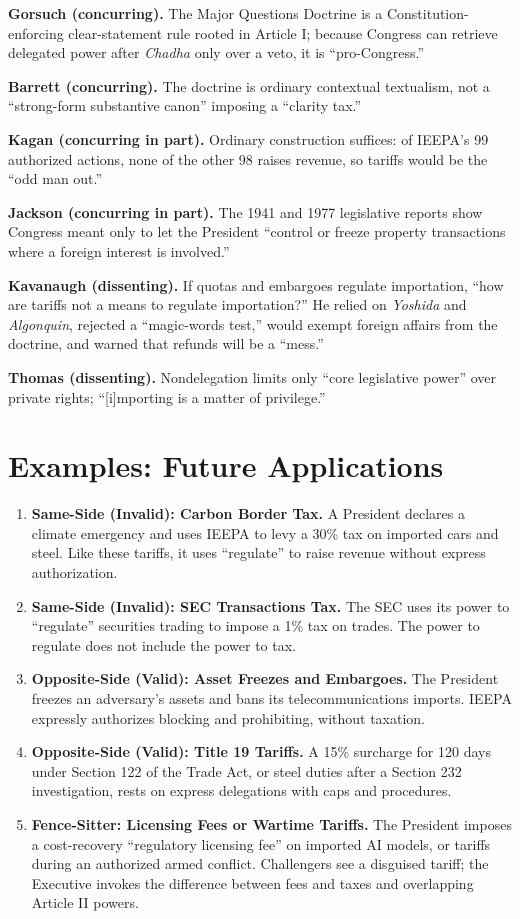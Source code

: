 \documentclass[12pt]{article}
\begin{document}
\textbf{Gorsuch (concurring).} The Major Questions Doctrine is a Constitution-enforcing clear-statement rule rooted in Article I; because Congress can retrieve delegated power after \textit{Chadha} only over a veto, it is ``pro-Congress.''

\textbf{Barrett (concurring).} The doctrine is ordinary contextual textualism, not a ``strong-form substantive canon'' imposing a ``clarity tax.''

\textbf{Kagan (concurring in part).} Ordinary construction suffices: of IEEPA's 99 authorized actions, none of the other 98 raises revenue, so tariffs would be the ``odd man out.''

\textbf{Jackson (concurring in part).} The 1941 and 1977 legislative reports show Congress meant only to let the President ``control or freeze property transactions where a foreign interest is involved.''

\textbf{Kavanaugh (dissenting).} If quotas and embargoes regulate importation, ``how are tariffs not a means to regulate importation?'' He relied on \textit{Yoshida} and \textit{Algonquin}, rejected a ``magic-words test,'' would exempt foreign affairs from the doctrine, and warned that refunds will be a ``mess.''

\textbf{Thomas (dissenting).} Nondelegation limits only ``core legislative power'' over private rights; ``[i]mporting is a matter of privilege.''

\section{Examples: Future Applications}

\begin{enumerate}
\item \textbf{Same-Side (Invalid): Carbon Border Tax.} A President declares a climate emergency and uses IEEPA to levy a 30\% tax on imported cars and steel. Like these tariffs, it uses ``regulate'' to raise revenue without express authorization.
\item \textbf{Same-Side (Invalid): SEC Transactions Tax.} The SEC uses its power to ``regulate'' securities trading to impose a 1\% tax on trades. The power to regulate does not include the power to tax.
\item \textbf{Opposite-Side (Valid): Asset Freezes and Embargoes.} The President freezes an adversary's assets and bans its telecommunications imports. IEEPA expressly authorizes blocking and prohibiting, without taxation.
\item \textbf{Opposite-Side (Valid): Title 19 Tariffs.} A 15\% surcharge for 120 days under Section 122 of the Trade Act, or steel duties after a Section 232 investigation, rests on express delegations with caps and procedures.
\item \textbf{Fence-Sitter: Licensing Fees or Wartime Tariffs.} The President imposes a cost-recovery ``regulatory licensing fee'' on imported AI models, or tariffs during an authorized armed conflict. Challengers see a disguised tariff; the Executive invokes the difference between fees and taxes and overlapping Article II powers.
\end{enumerate}
\end{document}
